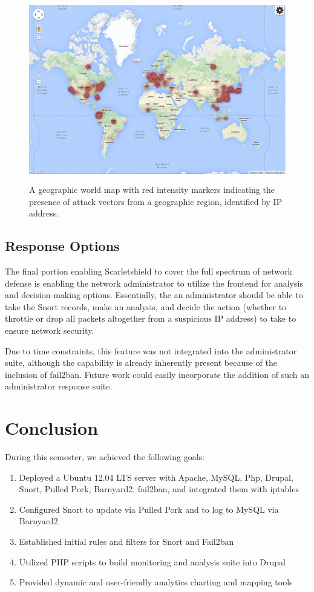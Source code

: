 \documentclass[11.5pt,letterpaper,titlepage]{report}
\begin{document}
\begin{figure}[h!]
\centering
  \includegraphics[height=8cm]{./heatmap.png}
  \caption{A geographic world map with red intensity markers indicating
  the presence of attack vectors from a geographic region, identified by IP address.}
\end{figure}

\section{Response Options}

The final portion enabling Scarletshield to cover the full spectrum of network
defense is enabling the network administrator to utilize the frontend for
analysis and decision-making options.  Essentially, the an administrator should
be able to take the Snort records, make an analysis, and decide the action
(whether to throttle or drop all packets altogether from a suspicious IP
address) to take to ensure network security.

Due to time constraints, this feature was not integrated into the administrator
suite, although the capability is already inherently present because of the
inclusion of fail2ban. Future work could easily incorporate the addition of such
an administrator response suite.

\chapter{Conclusion}

During this semester, we achieved the following goals:

\begin{enumerate}
\item Deployed a Ubuntu 12.04 LTS server with Apache, MySQL, Php, Drupal, Snort,
		Pulled Pork, Barnyard2, fail2ban, and integrated them with iptables
\item Configured Snort to update via Pulled Pork and to log to MySQL via Barnyard2
\item Established initial rules and filters for Snort and Fail2ban
\item Utilized PHP scripts to build monitoring and analysis suite into Drupal
\item Provided dynamic and user-friendly analytics charting and mapping tools
\end{enumerate}
\end{document}
